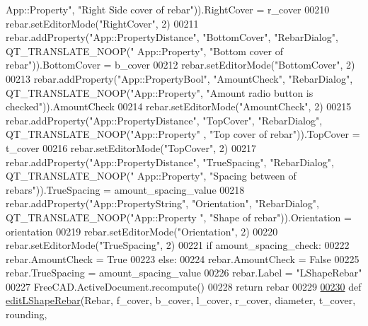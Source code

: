 \begin{DoxyCode}
{      App::Property"}, \textcolor{stringliteral}{"Right Side cover of rebar"})).RightCover = r\_cover
00210     rebar.setEditorMode(\textcolor{stringliteral}{"RightCover"}, 2)
00211     rebar.addProperty(\textcolor{stringliteral}{"App::PropertyDistance"}, \textcolor{stringliteral}{"BottomCover"}, \textcolor{stringliteral}{"RebarDialog"}, QT\_TRANSLATE\_NOOP(\textcolor{stringliteral}{"
      App::Property"}, \textcolor{stringliteral}{"Bottom cover of rebar"})).BottomCover = b\_cover
00212     rebar.setEditorMode(\textcolor{stringliteral}{"BottomCover"}, 2)
00213     rebar.addProperty(\textcolor{stringliteral}{"App::PropertyBool"}, \textcolor{stringliteral}{"AmountCheck"}, \textcolor{stringliteral}{"RebarDialog"}, QT\_TRANSLATE\_NOOP(\textcolor{stringliteral}{"App::Property"},
       \textcolor{stringliteral}{"Amount radio button is checked"})).AmountCheck
00214     rebar.setEditorMode(\textcolor{stringliteral}{"AmountCheck"}, 2)
00215     rebar.addProperty(\textcolor{stringliteral}{"App::PropertyDistance"}, \textcolor{stringliteral}{"TopCover"}, \textcolor{stringliteral}{"RebarDialog"}, QT\_TRANSLATE\_NOOP(\textcolor{stringliteral}{"App::Property"}
      , \textcolor{stringliteral}{"Top cover of rebar"})).TopCover = t\_cover
00216     rebar.setEditorMode(\textcolor{stringliteral}{"TopCover"}, 2)
00217     rebar.addProperty(\textcolor{stringliteral}{"App::PropertyDistance"}, \textcolor{stringliteral}{"TrueSpacing"}, \textcolor{stringliteral}{"RebarDialog"}, QT\_TRANSLATE\_NOOP(\textcolor{stringliteral}{"
      App::Property"}, \textcolor{stringliteral}{"Spacing between of rebars"})).TrueSpacing = amount\_spacing\_value
00218     rebar.addProperty(\textcolor{stringliteral}{"App::PropertyString"}, \textcolor{stringliteral}{"Orientation"}, \textcolor{stringliteral}{"RebarDialog"}, QT\_TRANSLATE\_NOOP(\textcolor{stringliteral}{"App::Property
      "}, \textcolor{stringliteral}{"Shape of rebar"})).Orientation = orientation
00219     rebar.setEditorMode(\textcolor{stringliteral}{"Orientation"}, 2)
00220     rebar.setEditorMode(\textcolor{stringliteral}{"TrueSpacing"}, 2)
00221     \textcolor{keywordflow}{if} amount\_spacing\_check:
00222         rebar.AmountCheck = \textcolor{keyword}{True}
00223     \textcolor{keywordflow}{else}:
00224         rebar.AmountCheck = \textcolor{keyword}{False}
00225         rebar.TrueSpacing = amount\_spacing\_value
00226     rebar.Label = \textcolor{stringliteral}{"LShapeRebar"}
00227     FreeCAD.ActiveDocument.recompute()
00228     \textcolor{keywordflow}{return} rebar
00229 
\hypertarget{LShapeRebar_8py_source.tex_l00230}{}\hyperlink{namespaceLShapeRebar_a9915291e3457e1c27f556d7903e02486}{00230} \textcolor{keyword}{def }\hyperlink{namespaceLShapeRebar_a9915291e3457e1c27f556d7903e02486}{editLShapeRebar}(Rebar, f\_cover, b\_cover, l\_cover, r\_cover, diameter, t\_cover, rounding, 

\end{DoxyCode}
